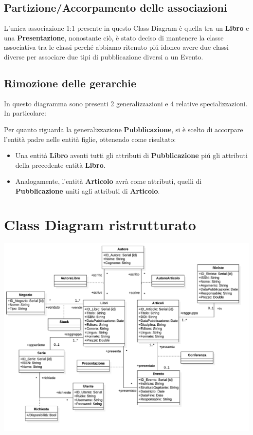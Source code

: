         \subsection{Partizione/Accorpamento delle associazioni}
        L'unica associazione 1:1 presente in questo Class Diagram \`e quella tra un \textbf{Libro} e una \textbf{Presentazione},
        nonostante ci\`o, \`e stato deciso di mantenere la classe associativa tra le classi perché abbiamo ritenuto pi\'u idoneo
        avere due classi diverse per associare due tipi di pubblicazione diversi a un Evento.

            
        \subsection{Rimozione delle gerarchie}
            In questo diagramma sono presenti 2 generalizzazioni e 4 relative specializzazioni.
            In particolare:

            Per quanto riguarda la generalizzazione \textbf{Pubblicazione}, si \`e scelto di accorpare l'entit\`a padre
            nelle entit\`a figlie, ottenendo come risultato:
            \begin{itemize}
                  \item Una entit\`a \textbf{Libro} aventi tutti gli attributi di \textbf{Pubblicazione} pi\'u
                        gli attributi della precedente entit\`a \textbf{Libro}.
                  \item Analogamente, l'entit\`a \textbf{Articolo} avr\`a come attributi, quelli di \textbf{Pubblicazione}
                        uniti agli attributi di \textbf{Articolo}.
            \end{itemize}
    
    \section{Class Diagram ristrutturato}
    \includegraphics[scale=0.25]{Immagini/SchemaRistrutturato.png}
        \pagebreak
